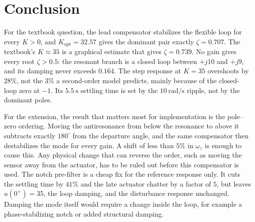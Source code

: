 \documentclass[12pt,a4paper]{article}
\begin{document}
\section{Conclusion}

For the textbook question, the lead compensator stabilizes the flexible loop for every \(K>0\), and \(K_{\mathrm{opt}}=32.57\) gives the dominant pair exactly \(\zeta=0.707\). The textbook's \(K\approx35\) is a graphical estimate that gives \(\zeta=0.739\).
No gain gives every root \(\zeta>0.5\): the resonant branch is a closed loop between \(+j10\) and \(+j9\), and its damping never exceeds \(0.164\).
The step response at \(K=35\) overshoots by \(28\%\), not the \(3\%\) a second-order model predicts, mainly because of the closed-loop zero at \(-1\). Its \(5.5~\mathrm{s}\) settling time is set by the \(10~\mathrm{rad/s}\) ripple, not by the dominant poles.

For the extension, the result that matters most for implementation is the pole--zero ordering.
Moving the antiresonance from below the resonance to above it subtracts exactly \(180^\circ\) from the departure angle, and the same compensator then destabilizes the mode for every gain.
A shift of less than \(5\%\) in \(\omega_z\) is enough to cause this.
Any physical change that can reverse the order, such as moving the sensor away from the actuator, has to be ruled out before this compensator is used.
The notch pre-filter is a cheap fix for the reference response only. It cuts the settling time by \(41\%\) and the late actuator chatter by a factor of \(5\), but leaves \(u(0^+)=35\), the loop damping, and the disturbance response unchanged.
Damping the mode itself would require a change inside the loop, for example a phase-stabilizing notch or added structural damping.
\end{document}
